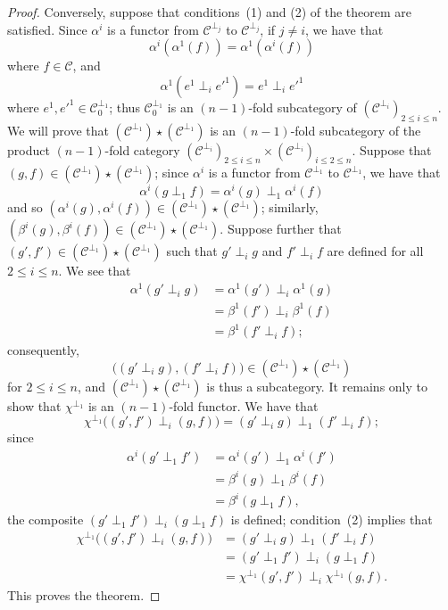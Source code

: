 \documentclass[a4paper,fleqn]{article}
\theoremstyle{plain}
\theoremstyle{definition}
\renewcommand{\leq}{\leqslant}
\newcommand{\oldpage}[1]{{\marginpar{\footnotesize$\bigg\vert$\,\,\,\,\textit{p.~#1}}}}
\newcommand{\CC}{\mathcal{C}}
\begin{document}
\begin{proof}
  Conversely, suppose that conditions~(1) and (2) of the theorem are satisfied.
  Since $\alpha^i$ is a functor from $\CC^{\perp_j}$ to $\CC^{\perp_j}$, if $j\neq i$, we have that
  \[
    \alpha^i(\alpha^1(f))
    = \alpha^1(\alpha^i(f))
  \]
  where $f\in\CC$, and
  \[
    \alpha^1(e^1\perp_i e'^1)
    = e^1\perp_i e'^1
  \]
  where $e^1,e'^1\in\CC_0^{\perp_1}$;
  thus $\CC_0^{\perp_1}$ is an $(n-1)$-fold subcategory of $(\CC^{\perp_i})_{2\leq i\leq n}$.
  We will prove that $(\CC^{\perp_1})\star(\CC^{\perp_1})$ is an $(n-1)$-fold subcategory of the product $(n-1)$-fold category $(\CC^{\perp_i})_{2\leq i\leq n}\times(\CC^{\perp_i})_{i\leq 2\leq n}$.
  Suppose that $(g,f)\in(\CC^{\perp_1})\star(\CC^{\perp_1})$;
  since $\alpha^i$ is a functor from $\CC^{\perp_1}$ to $\CC^{\perp_1}$, we have that
  \[
    \alpha^i(g\perp_1 f)
    = \alpha^i(g)\perp_1\alpha^i(f)
  \]
  and so $(\alpha^i(g),\alpha^i(f))\in(\CC^{\perp_1})\star(\CC^{\perp_1})$;
  similarly, $(\beta^i(g),\beta^i(f))\in(\CC^{\perp_1})\star(\CC^{\perp_1})$.
  Suppose further that $(g',f')\in(\CC^{\perp_1})\star(\CC^{\perp_1})$ such that $g'\perp_i g$ and $f'\perp_i f$ are defined for all $2\leq i\leq n$.
  We see that
  \[
    \begin{aligned}
      \alpha^1(g'\perp_i g)
      &= \alpha^1(g')\perp_i\alpha^1(g)
    \\&= \beta^1(f')\perp_i\beta^1(f)
    \\&= \beta^1(f'\perp_i f);
    \end{aligned}
  \]
  consequently,
  \[
    \big(
      (g'\perp_i g), (f'\perp_i f)
    \big)
    \in(\CC^{\perp_1})\star(\CC^{\perp_1})
  \]
  for $2\leq i\leq n$, and $(\CC^{\perp_1})\star(\CC^{\perp_1})$ is thus a subcategory.
  It remains only to show that $\chi^{\perp_1}$ is an $(n-1)$-fold functor.
  We have that
  \[
    \chi^{\perp_1}\big(
      (g',f')\perp_i(g,f)
    \big)
    = (g'\perp_i g)\perp_1(f'\perp_i f);
  \]
  \oldpage{398}
  since
  \[
    \begin{aligned}
      \alpha^i(g'\perp_1 f')
      &= \alpha^i(g')\perp_1\alpha^i(f')
    \\&= \beta^i(g)\perp_1\beta^i(f)
    \\&= \beta^i(g\perp_1 f),
    \end{aligned}
  \]
  the composite $(g'\perp_1 f')\perp_i(g\perp_1 f)$ is defined;
  condition~(2) implies that
  \[
    \begin{aligned}
      \chi^{\perp_1}\big(
        (g',f')\perp_i(g,f)
      \big)
      &= (g'\perp_i g)\perp_1(f'\perp_i f)
    \\&= (g'\perp_1 f')\perp_i(g\perp_1 f)
    \\&= \chi^{\perp_1}(g',f')\perp_i\chi^{\perp_1}(g,f).
    \end{aligned}
  \]
  This proves the theorem.
\end{proof}
\end{document}
